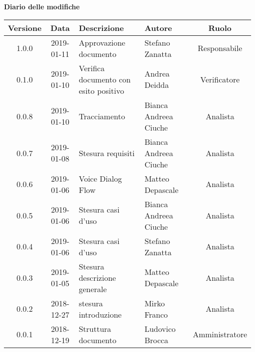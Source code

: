 	\begin{center}
		\textbf{Diario delle modifiche}
	\end{center}
	\begin{center}
		\begin{tabularx}{\textwidth}{|c|c|X|X|c|}
			\hline
			\textbf{Versione} & \textbf{Data} & \textbf{Descrizione} & \textbf{Autore} & \textbf{Ruolo} \\
			\hline
			1.0.0 & 2019-01-11 & Approvazione documento& Stefano Zanatta & Responsabile\\
			\hline
			0.1.0 & 2019-01-10 & Verifica documento con esito positivo& Andrea Deidda & Verificatore\\
			\hline
			0.0.8 & 2019-01-10 &Tracciamento& Bianca Andreea Ciuche& Analista\\
			\hline
			0.0.7 & 2019-01-08 &Stesura requisiti & Bianca Andreea Ciuche& Analista\\
			\hline
			0.0.6 & 2019-01-06 & Voice Dialog Flow & Matteo Depascale & Analista\\
			\hline
			0.0.5 & 2019-01-06 & Stesura casi d'uso& Bianca Andreea Ciuche & Analista\\
			\hline
			0.0.4 & 2019-01-06 & Stesura casi d'uso& Stefano Zanatta & Analista\\
			\hline
			0.0.3 & 2019-01-05 & Stesura descrizione generale& Matteo Depascale & Analista\\
			\hline
			0.0.2 & 2018-12-27 & stesura introduzione & Mirko Franco & Analista\\
			\hline
			0.0.1 & 2018-12-19 & Struttura documento & Ludovico Brocca & Amministratore\\
			\hline
		\end{tabularx}
	\end{center}
\newpage